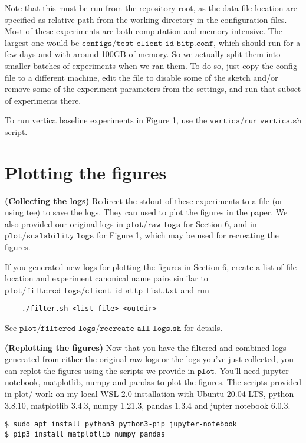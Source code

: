 \documentclass[11pt]{article}
\begin{document}
Note that this must be run from the repository root, as the data file
location are specified as relative path from the working directory in
the configuration files. Most of these experiments are both
computation and memory intensive. The largest one would be
$\texttt{configs/test-client-id-bitp.conf}$, which should run for a
few days and with around 100GB of memory. So we actually split them
into smaller batches of experiments when we ran them. To do so, just
copy the config file to a different machine, edit the file to disable some of the sketch
and/or remove some of the experiment parameters from the settings, and
run that subset of experiments there.

To run vertica baseline experiments in Figure 1, use the
$\texttt{vertica/run\_vertica.sh}$ script.

\section{Plotting the figures}

{\bf (Collecting the logs) } Redirect the stdout of these experiments
to a file (or using tee) to save the logs. They can used to plot the
figures in the paper. We also provided our original logs in
$\texttt{plot/raw\_logs}$ for Section 6, and in
$\texttt{plot/scalability\_logs}$ for Figure 1, which may be used for
recreating the figures.

If you generated new logs for plotting the figures in Section 6,
create a list of file location and experiment canonical name pairs
similar to $\texttt{plot/filtered\_logs/client\_id\_attp\_list.txt}$
and run
\begin{verbatim}
	./filter.sh <list-file> <outdir>
\end{verbatim}
See $\texttt{plot/filtered\_logs/recreate\_all\_logs.sh}$ for details.

{\bf (Replotting the figures) } Now that you have the filtered and
combined logs generated from either the original raw logs or the logs
you've just collected, you can replot the figures using the scripts we
provide in $\texttt{plot}$.
You'll need jupyter notebook, matplotlib, numpy and pandas to plot the
figures. The scripts provided in plot/ work on my local WSL 2.0
installation with Ubuntu 20.04 LTS, python 3.8.10, matplotlib 3.4.3,
numpy 1.21.3, pandas 1.3.4 and jupter notebook 6.0.3.
\begin{verbatim}
$ sudo apt install python3 python3-pip jupyter-notebook
$ pip3 install matplotlib numpy pandas
\end{verbatim}
\end{document}
